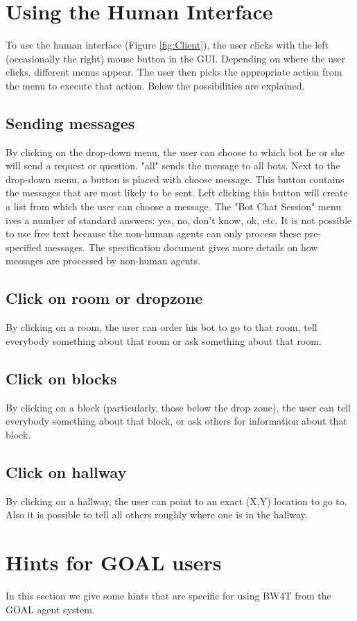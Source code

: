 \documentclass[11pt,a4paper]{article}
\begin{document}
\section{Using the Human Interface}
\label{ch:usingHI} 
To use the human interface (Figure \ref{fig:Client}), the user clicks with the left (occasionally the right) mouse button in the GUI. Depending on where the user clicks, different menus appear. The user then picks the appropriate action from the menu to execute that action. Below the possibilities are explained.

\subsection{Sending messages}
By clicking on the drop-down menu, the user can choose to which bot he or she will send a request or question. "all" sends the message to all bots. Next to the drop-down menu, a button is placed with choose message. This button contains the messages that are most likely to be sent. Left clicking this button will create a list from which the user can choose a message. The "Bot Chat Session" menu ives a number of standard answers: yes, no, don't know, ok, etc. It is not possible to use free text because the non-human agents can only process these pre-specified messages. The specification document gives more details on how messages are processed by non-human agents.
\subsection{Click on room or dropzone}
By clicking on a room, the user can order his bot to go to that room, tell everybody something about that room or ask something about that room.
\subsection{Click on blocks}
By clicking on a block (particularly, those below the drop zone), the user can tell everybody something about that block, or ask others for information about that block.
\subsection{Click on hallway}
By clicking on a hallway, the user can point to an exact (X,Y) location to go to. Also it is possible to tell all others roughly where one is in the hallway.

\section{Hints for GOAL users}
In this section we give some hints that are specific for using BW4T from the GOAL agent system.
\end{document}
